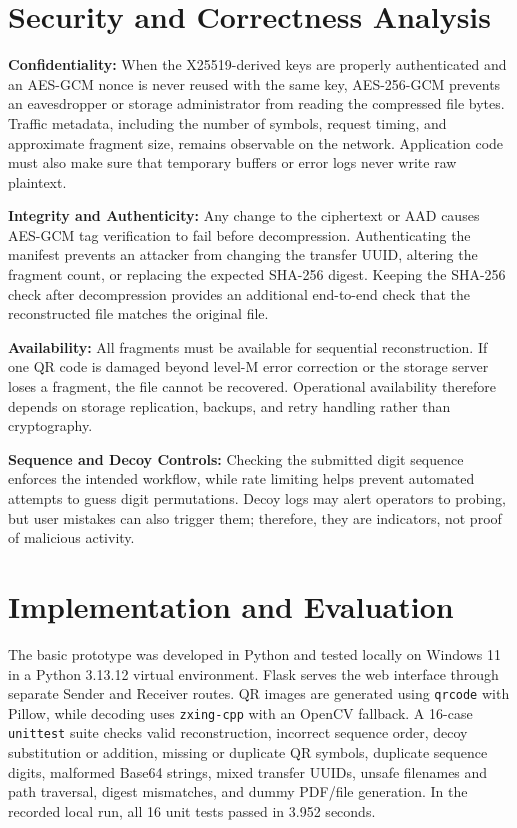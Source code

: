 \documentclass[conference]{IEEEtran}
\begin{document}
\section{Security and Correctness Analysis}
\textbf{Confidentiality:} When the X25519-derived keys are properly authenticated and an AES-GCM nonce is never reused with the same key, AES-256-GCM prevents an eavesdropper or storage administrator from reading the compressed file bytes. Traffic metadata, including the number of symbols, request timing, and approximate fragment size, remains observable on the network. Application code must also make sure that temporary buffers or error logs never write raw plaintext.

\textbf{Integrity and Authenticity:} Any change to the ciphertext or AAD causes AES-GCM tag verification to fail before decompression. Authenticating the manifest prevents an attacker from changing the transfer UUID, altering the fragment count, or replacing the expected SHA-256 digest. Keeping the SHA-256 check after decompression provides an additional end-to-end check that the reconstructed file matches the original file.

\textbf{Availability:} All fragments must be available for sequential reconstruction. If one QR code is damaged beyond level-M error correction or the storage server loses a fragment, the file cannot be recovered. Operational availability therefore depends on storage replication, backups, and retry handling rather than cryptography.

\textbf{Sequence and Decoy Controls:} Checking the submitted digit sequence enforces the intended workflow, while rate limiting helps prevent automated attempts to guess digit permutations. Decoy logs may alert operators to probing, but user mistakes can also trigger them; therefore, they are indicators, not proof of malicious activity.

\section{Implementation and Evaluation}
The basic prototype was developed in Python and tested locally on Windows 11 in a Python 3.13.12 virtual environment. Flask serves the web interface through separate Sender and Receiver routes. QR images are generated using \texttt{qrcode} with Pillow, while decoding uses \texttt{zxing-cpp} with an OpenCV fallback. A 16-case \texttt{unittest} suite checks valid reconstruction, incorrect sequence order, decoy substitution or addition, missing or duplicate QR symbols, duplicate sequence digits, malformed Base64 strings, mixed transfer UUIDs, unsafe filenames and path traversal, digest mismatches, and dummy PDF/file generation. In the recorded local run, all 16 unit tests passed in 3.952 seconds.
\end{document}
